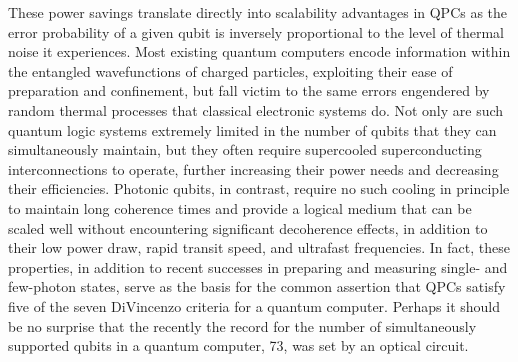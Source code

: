 \documentclass[11pt,a4paper]{article}
\begin{document}
These power savings translate directly into scalability advantages in QPCs as the error probability of a given qubit is inversely proportional to the level of thermal noise it experiences. Most existing quantum computers encode information within the entangled wavefunctions of charged particles, exploiting their ease of preparation and confinement, but fall victim to the same errors engendered by random thermal processes that classical electronic systems do. Not only are such quantum logic systems extremely limited in the number of qubits that they can simultaneously maintain, but they often require supercooled superconducting interconnections to operate, further increasing their power needs and decreasing their efficiencies.\supercite{arute_quantum_2019} Photonic qubits, in contrast, require no such cooling in principle to maintain long coherence times and provide a logical medium that can be scaled well without encountering significant decoherence effects, in addition to their low power draw, rapid transit speed, and ultrafast frequencies.\supercite{miller_are_2010,tuniz_nanoscale_2021} In fact, these properties, in addition to recent successes in preparing and measuring single- and few-photon states, serve as the basis for the common assertion that QPCs satisfy five of the seven DiVincenzo criteria for a quantum computer.\supercite{slussarenko_photonic_2019} Perhaps it should be no surprise that the recently the record for the number of simultaneously supported qubits in a quantum computer, 73, was set by an optical circuit.\supercite{zhong_quantum_2020}
\end{document}
